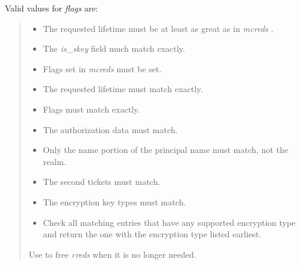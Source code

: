 \documentclass[letterpaper,10pt,english]{sphinxmanual}
\begin{document}
Valid values for \emph{flags} are:
\begin{quote}
\begin{itemize}
\item {} 
{\hyperref[appdev/refs/macros/KRB5_TC_MATCH_TIMES:KRB5_TC_MATCH_TIMES]{}} The requested lifetime must be at least as great as in \emph{mcreds} .

\item {} 
{\hyperref[appdev/refs/macros/KRB5_TC_MATCH_IS_SKEY:KRB5_TC_MATCH_IS_SKEY]{}} The \emph{is\_skey} field much match exactly.

\item {} 
{\hyperref[appdev/refs/macros/KRB5_TC_MATCH_FLAGS:KRB5_TC_MATCH_FLAGS]{}} Flags set in \emph{mcreds} must be set.

\item {} 
{\hyperref[appdev/refs/macros/KRB5_TC_MATCH_TIMES_EXACT:KRB5_TC_MATCH_TIMES_EXACT]{}} The requested lifetime must match exactly.

\item {} 
{\hyperref[appdev/refs/macros/KRB5_TC_MATCH_FLAGS_EXACT:KRB5_TC_MATCH_FLAGS_EXACT]{}} Flags must match exactly.

\item {} 
{\hyperref[appdev/refs/macros/KRB5_TC_MATCH_AUTHDATA:KRB5_TC_MATCH_AUTHDATA]{}} The authorization data must match.

\item {} 
{\hyperref[appdev/refs/macros/KRB5_TC_MATCH_SRV_NAMEONLY:KRB5_TC_MATCH_SRV_NAMEONLY]{}} Only the name portion of the principal name must match, not the realm.

\item {} 
{\hyperref[appdev/refs/macros/KRB5_TC_MATCH_2ND_TKT:KRB5_TC_MATCH_2ND_TKT]{}} The second tickets must match.

\item {} 
{\hyperref[appdev/refs/macros/KRB5_TC_MATCH_KTYPE:KRB5_TC_MATCH_KTYPE]{}} The encryption key types must match.

\item {} 
{\hyperref[appdev/refs/macros/KRB5_TC_SUPPORTED_KTYPES:KRB5_TC_SUPPORTED_KTYPES]{}} Check all matching entries that have any supported encryption type and return the one with the encryption type listed earliest.

\end{itemize}

Use {\hyperref[appdev/refs/api/krb5_free_cred_contents:krb5_free_cred_contents]{}} to free \emph{creds} when it is no longer needed.
\end{quote}
\end{document}
